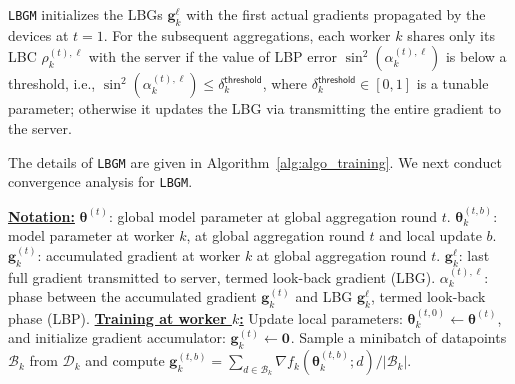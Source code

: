 \documentclass{article}
\renewcommand{\vec}[3]{\boldsymbol{#1}_{#2}^{#3}}
\newcommand{\subsup}[3]{#1_{#2}^{#3}}
\newcommand{\algName}{{\tt LBGM}}
\newcommand{\algFullName}{Look-back Gradient Multiplier}
\begin{document}
{\algName} initializes the LBGs $\vec{g}{k}{\ell}$ with the first actual gradients propagated by the devices at $t=1$.
For the subsequent aggregations, each worker $k$ shares only its LBC $\subsup{\rho}{k}{(t),\ell}$ with the server if the value of LBP error $\sin^2(\subsup{\alpha}{k}{(t),\ell})$ is below a threshold, i.e., $\sin^2(\subsup{\alpha}{k}{(t),\ell}) \leq \subsup{\delta}{k}{\mathsf{threshold}}$, where $\subsup{\delta}{k}{\mathsf{threshold}}\in[0,1]$ is a tunable parameter; otherwise it updates the LBG via transmitting the entire gradient to the server.

The details of {\algName} are given in Algorithm~\ref{alg:algo_training}. 
We next conduct convergence analysis for \algName.

\begin{algorithm}[t]
{\footnotesize 
  \caption{\algName: \algFullName}
\label{alg:algo_training}
\begin{algorithmic}[1]
    \Statex \textbf{\underline{Notation:}}
    \Statex $\vec{\theta}{}{(t)}$: global model parameter at global aggregation round $t$.
    \Statex $\vec{\theta}{k}{(t, b)}$: model parameter at worker $k$, at global aggregation round $t$ and local update $b$.
    \Statex $\vec{g}{k}{(t)}$: accumulated gradient at worker $k$ at global aggregation round $t$.
    \Statex $\vec{g}{k}{\ell}$: last full gradient transmitted to server, termed look-back gradient (LBG).
    \Statex $\subsup{\alpha}{k}{(t), \ell}$: phase between the accumulated gradient $\vec{g}{k}{(t)}$ and LBG $\vec{g}{k}{\ell}$, termed look-back phase (LBP).
    \Statex \textbf{\underline{Training at worker $k$:}}
    \State Update local parameters: $\vec{\theta}{k}{(t, 0)} \leftarrow \vec{\theta}{}{(t)}$, and initialize gradient accumulator: $\vec{g}{k}{(t)} \leftarrow \vec{0}{}{}$.
        \State Sample a minibatch of  datapoints $\mathcal{B}_k$ from  $\mathcal{D}_{k}$ and compute $\vec{g}{k}{(t, b)}= \sum_{d\in \mathcal{B}_k} \nabla f_k(\vec{\theta}{k}{(t, b)};d)/|\mathcal{B}_k|$.
        

\end{algorithmic}}
\end{algorithm}
\end{document}
